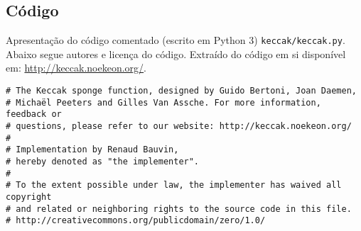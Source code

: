 \documentclass[12pt, a4paper]{article}
\begin{document}
\subsection{Código}
\label{codeprint}

Apresentação do código comentado (escrito em Python 3) \verb|keccak/keccak.py|.
Abaixo segue autores e licença do código. Extraído do código em si disponível
em: \href{http://keccak.noekeon.org/}{http://keccak.noekeon.org/}.

\begin{verbatim}
# The Keccak sponge function, designed by Guido Bertoni, Joan Daemen,
# Michaël Peeters and Gilles Van Assche. For more information, feedback or
# questions, please refer to our website: http://keccak.noekeon.org/
#
# Implementation by Renaud Bauvin,
# hereby denoted as "the implementer".
#
# To the extent possible under law, the implementer has waived all copyright
# and related or neighboring rights to the source code in this file.
# http://creativecommons.org/publicdomain/zero/1.0/
\end{verbatim}
\end{document}
